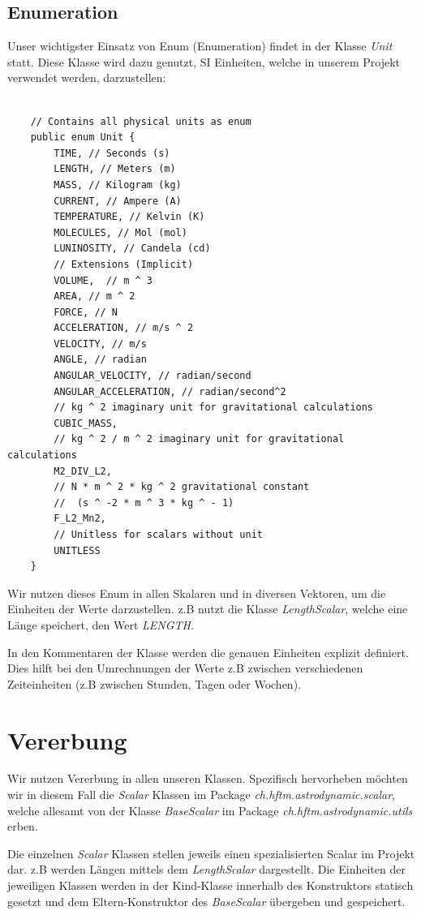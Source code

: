 \subsection{Enumeration}

Unser wichtigster Einsatz von Enum (Enumeration) findet in der Klasse \textit{Unit} statt. Diese Klasse wird dazu genutzt, SI Einheiten, welche in unserem Projekt verwendet werden, darzustellen:

\begin{lstlisting}
	
	// Contains all physical units as enum
	public enum Unit {
		TIME, // Seconds (s)
		LENGTH, // Meters (m)
		MASS, // Kilogram (kg)
		CURRENT, // Ampere (A)
		TEMPERATURE, // Kelvin (K)
		MOLECULES, // Mol (mol)
		LUNINOSITY, // Candela (cd)
		// Extensions (Implicit)
		VOLUME,  // m ^ 3
		AREA, // m ^ 2
		FORCE, // N
		ACCELERATION, // m/s ^ 2
		VELOCITY, // m/s
		ANGLE, // radian
		ANGULAR_VELOCITY, // radian/second
		ANGULAR_ACCELERATION, // radian/second^2
		// kg ^ 2 imaginary unit for gravitational calculations
		CUBIC_MASS, 
		// kg ^ 2 / m ^ 2 imaginary unit for gravitational calculations
		M2_DIV_L2,
		// N * m ^ 2 * kg ^ 2 gravitational constant
		//  (s ^ -2 * m ^ 3 * kg ^ - 1) 
		F_L2_Mn2,
		// Unitless for scalars without unit
		UNITLESS
	}

\end{lstlisting}

Wir nutzen dieses Enum in allen Skalaren und in diversen Vektoren, um die Einheiten der Werte darzustellen. z.B nutzt die Klasse \textit{LengthScalar}, welche eine Länge speichert, den Wert \textit{LENGTH}.

In den Kommentaren der Klasse werden die genauen Einheiten explizit definiert. Dies hilft bei den Umrechnungen der Werte z.B zwischen verschiedenen Zeiteinheiten (z.B zwischen Stunden, Tagen oder Wochen).

\section{Vererbung}

Wir nutzen Vererbung in allen unseren Klassen. Spezifisch hervorheben möchten wir in diesem Fall die \textit{Scalar} Klassen im Package \textit{ch.hftm.astrodynamic.scalar}, welche allesamt von der Klasse \textit{BaseScalar} im Package \textit{ch.hftm.astrodynamic.utils} erben.

Die einzelnen \textit{Scalar} Klassen stellen jeweils einen spezialisierten Scalar im Projekt dar. z.B werden Längen mittels dem \textit{LengthScalar} dargestellt.
Die Einheiten der jeweiligen Klassen werden in der Kind-Klasse innerhalb des Konstruktors statisch gesetzt und dem Eltern-Konstruktor des \textit{BaseScalar} übergeben und gespeichert.

